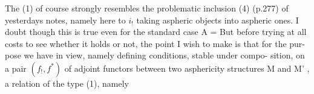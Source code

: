 The   (1) of course strongly resembles the problematic
inclusion (4) (p.277) of yesterdays notes,  namely\hand{,}  here to $i_!$ taking
aspheric objects into aspheric ones.  I doubt though this  is true even
for the standard case A = \hand{$\Delta$}  But before trying at all costs to see
whether it holds or not,  the point I wish to make is that for the pur-%
pose we have in view,  namely defining  conditions,  stable under compo-%
sition,   on a pair $(f_!,f^*)$ of adjoint functors between
two asphericity structures M and M' ,   a relation of the type  (1),
namely

